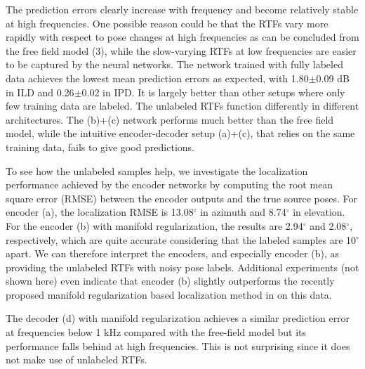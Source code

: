 \documentclass{article}
\begin{document}
The prediction errors clearly increase with frequency and become relatively stable at high frequencies. One possible reason could be that the RTFs vary more rapidly with respect to pose changes at high frequencies as can be concluded from the free field model (3), while the slow-varying RTFs at low frequencies are easier to be captured by the neural networks. The network trained with fully labeled data achieves the lowest mean prediction errors as expected, with 1.80$\pm$0.09 dB in ILD and 0.26$\pm$0.02 in IPD. It is largely better than other setups where only few training data are labeled. The unlabeled RTFs function differently in different architectures. The (b)+(c) network performs much better than the free field model, while the intuitive encoder-decoder setup (a)+(c), that relies on the same training data, fails to give good predictions.

To see how the unlabeled samples help, we investigate the localization performance achieved by the encoder networks by computing the root mean square error (RMSE) between the encoder outputs and the true source poses. For encoder (a), the localization RMSE is 13.08$^{\circ}$ in azimuth and 8.74$^{\circ}$ in elevation. For the encoder (b) with manifold regularization, the results are 2.94$^{\circ}$ and 2.08$^{\circ}$, respectively, which are quite accurate considering that the labeled samples are 10$^{\circ}$ apart. We can therefore interpret the encoders, and especially encoder (b), as providing the unlabeled RTFs with noisy pose labels. Additional experiments (not shown here) even indicate that encoder (b) slightly outperforms the recently proposed manifold regularization based localization method in \cite{laufer2016mr} on this data.

The decoder (d) with manifold regularization achieves a similar prediction error at frequencies below 1 kHz compared with the free-field model but its performance falls behind at high frequencies. This is not surprising since it does not make use of unlabeled RTFs.

\end{document}
